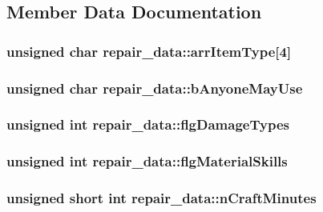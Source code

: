 \subsection{Member Data Documentation}
\hypertarget{structrepair__data_a0606072cc6581b1d5ca402204c436f88}{
\subsubsection[{arr\-Item\-Type}]{\setlength{\rightskip}{0pt plus 5cm}unsigned char repair\-\_\-data\-::arr\-Item\-Type\mbox{[}4\mbox{]}}}\label{structrepair__data_a0606072cc6581b1d5ca402204c436f88}
\hypertarget{structrepair__data_a6653d42ba1113629231aa0866039a8c1}{
\subsubsection[{b\-Anyone\-May\-Use}]{\setlength{\rightskip}{0pt plus 5cm}unsigned char repair\-\_\-data\-::b\-Anyone\-May\-Use}}\label{structrepair__data_a6653d42ba1113629231aa0866039a8c1}
\hypertarget{structrepair__data_a848d9f9734398c80549f983f6ed1f12e}{
\subsubsection[{flg\-Damage\-Types}]{\setlength{\rightskip}{0pt plus 5cm}unsigned int repair\-\_\-data\-::flg\-Damage\-Types}}\label{structrepair__data_a848d9f9734398c80549f983f6ed1f12e}
\hypertarget{structrepair__data_ac2c69e734cf15c23f0596e1163cf9147}{
\subsubsection[{flg\-Material\-Skills}]{\setlength{\rightskip}{0pt plus 5cm}unsigned int repair\-\_\-data\-::flg\-Material\-Skills}}\label{structrepair__data_ac2c69e734cf15c23f0596e1163cf9147}
\hypertarget{structrepair__data_aaf9cb30501da0fcdd9ec2d3a7f046163}{
\subsubsection[{n\-Craft\-Minutes}]{\setlength{\rightskip}{0pt plus 5cm}unsigned short int repair\-\_\-data\-::n\-Craft\-Minutes}}\label{structrepair__data_aaf9cb30501da0fcdd9ec2d3a7f046163}
